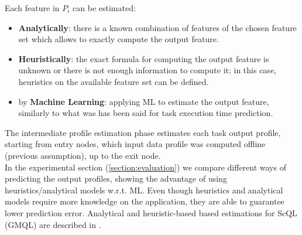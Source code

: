 \documentclass[a4paper, 10pt, conference]{ieeeconf}      %
\begin{document}
\noindent Each feature in $P_i$ can be estimated:
\begin{itemize}
    \item \textbf{Analytically}: there is a known combination of features of the chosen feature set which allows to exactly compute the output feature.
    \item \textbf{Heuristically}: the exact formula for computing the output feature is unknown or there is not enough information to compute it; in this case,  heuristics on the available feature set can be defined.
    \item by \textbf{Machine Learning}: applying ML to estimate the output feature, similarly to what was has been said  for task execution time prediction.
\end{itemize}
The intermediate profile estimation phase estimates each task output profile, starting from entry nodes, which input data profile was computed offline (previous assumption), up to the exit node.\\
In the experimental section (\ref{section:evaluation}) we compare different ways of predicting the output profiles, showing the advantage of using heuristics/analytical models w.r.t. ML. 
Even though heuristics and analytical models require more knowledge on the application, they are able to guarantee lower prediction error.
Analytical and heuristic-based based estimations for ScQL (GMQL) are described in \cite{binning}.




\end{document}

